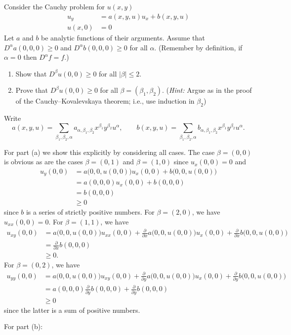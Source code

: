 \begin{problem}
  Consider the Cauchy problem for \(u(x,y)\)
  \begin{align*}
    u_y&=a(x, y, u)u_x+b(x,y,u)\\
    u(x,0)&=0
  \end{align*}
  Let \(a\) and \(b\) be analytic functions of their arguments. Assume that
  \(D^\alpha a(0,0,0)\geq 0\) and \(D^\alpha b(0,0,0)\geq 0\) for all
  \(\alpha\). (Remember by definition, if \(\alpha=0\) then
  \(D^\alpha f=f\).)
  \begin{enumerate}[label=(\alph*),noitemsep]
  \item Show that \(D^\beta u(0,0)\geq 0\) for all \(|\beta|\leq 2\).
  \item Prove that \(D^\beta u(0,0)\geq 0\) for all
    \(\beta=(\beta_1,\beta_2)\). (\emph{Hint:} Argue as in the proof of the
    Cauchy--Kovalevskaya theorem; i.e., use induction in \(\beta_2\))
  \end{enumerate}
\end{problem}
\begin{solution}
  Write
  \[
    a(x,y,u)=\sum_{\beta_1,\beta_2,\alpha}
    a_{\alpha,\beta_1,\beta_2}x^{\beta_1}y^{\beta_2}u^\alpha,\qquad
    b(x,y,u)=\sum_{\beta_1,\beta_2,\alpha}
    b_{\alpha,\beta_1,\beta_2}x^{\beta_1}y^{\beta_2}u^\alpha.
  \]

  For part (a) we show this explicitly by considering all cases. The case
  \(\beta=(0,0)\) is obvious as are the cases \(\beta=(0,1)\) and
  \(\beta=(1,0)\) since \(u_x(0,0)=0\) and
  \begin{align*}
    u_y(0,0)
    &=a\bigl(0,0,u(0,0)\bigr)u_x(0,0)+b\bigl( 0,0,u(0,0) \bigr)\\
    &=a(0,0,0)u_x(0,0)+b(0,0,0)\\
    &=b(0,0,0)\\
    &\geq 0
  \end{align*}
  since \(b\) is a series of strictly positive numbers. For
  \(\beta=(2,0)\), we have \(u_{xx}(0,0)=0\). For \(\beta=(1,1)\), we have
  \begin{align*}
    u_{xy}(0,0)&=a\bigl(0,0,u(0,0)\bigr)u_{xx}(0,0)+\frac{\partial}{\partial
                 x}a\bigl( 0,0,u(0,0) \bigr)u_x(0,0)
                 +\frac{\partial}{\partial x} b\bigl(0,0,u(0,0)\bigr)\\
               &=\frac{\partial}{\partial x} b(0,0,0)\\
               &\geq 0.
  \end{align*}
  For \(\beta=(0,2)\), we have
  \begin{align*}
    u_{yy}(0,0)&=a\bigl(0,0,u(0,0)\bigr)u_{xy}(0,0)+\frac{\partial}{\partial
                 y}a\bigl( 0,0,u(0,0) \bigr)u_x(0,0)
                 +\frac{\partial}{\partial y} b\bigl(0,0,u(0,0)\bigr)\\
               &=a(0,0,0)\frac{\partial}{\partial
                 y}b(0,0,0)+\frac{\partial}{\partial y}b(0,0,0)\\
               &\geq 0
  \end{align*}
  since the latter is a sum of positive numbers.

  For part (b):
\end{solution}
\newpage

